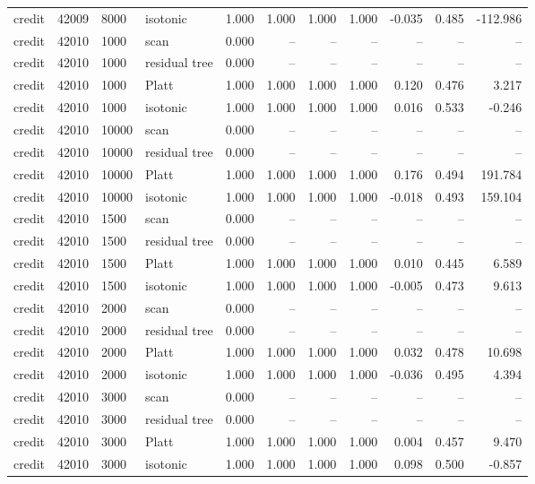 \begin{tabular}{lrllrrrrrrr}
credit & 42009 & 8000 & isotonic & 1.000 & 1.000 & 1.000 & 1.000 & -0.035 & 0.485 & -112.986 \\
credit & 42010 & 1000 & scan & 0.000 & -- & -- & -- & -- & -- & -- \\
credit & 42010 & 1000 & residual tree & 0.000 & -- & -- & -- & -- & -- & -- \\
credit & 42010 & 1000 & Platt & 1.000 & 1.000 & 1.000 & 1.000 & 0.120 & 0.476 & 3.217 \\
credit & 42010 & 1000 & isotonic & 1.000 & 1.000 & 1.000 & 1.000 & 0.016 & 0.533 & -0.246 \\
credit & 42010 & 10000 & scan & 0.000 & -- & -- & -- & -- & -- & -- \\
credit & 42010 & 10000 & residual tree & 0.000 & -- & -- & -- & -- & -- & -- \\
credit & 42010 & 10000 & Platt & 1.000 & 1.000 & 1.000 & 1.000 & 0.176 & 0.494 & 191.784 \\
credit & 42010 & 10000 & isotonic & 1.000 & 1.000 & 1.000 & 1.000 & -0.018 & 0.493 & 159.104 \\
credit & 42010 & 1500 & scan & 0.000 & -- & -- & -- & -- & -- & -- \\
credit & 42010 & 1500 & residual tree & 0.000 & -- & -- & -- & -- & -- & -- \\
credit & 42010 & 1500 & Platt & 1.000 & 1.000 & 1.000 & 1.000 & 0.010 & 0.445 & 6.589 \\
credit & 42010 & 1500 & isotonic & 1.000 & 1.000 & 1.000 & 1.000 & -0.005 & 0.473 & 9.613 \\
credit & 42010 & 2000 & scan & 0.000 & -- & -- & -- & -- & -- & -- \\
credit & 42010 & 2000 & residual tree & 0.000 & -- & -- & -- & -- & -- & -- \\
credit & 42010 & 2000 & Platt & 1.000 & 1.000 & 1.000 & 1.000 & 0.032 & 0.478 & 10.698 \\
credit & 42010 & 2000 & isotonic & 1.000 & 1.000 & 1.000 & 1.000 & -0.036 & 0.495 & 4.394 \\
credit & 42010 & 3000 & scan & 0.000 & -- & -- & -- & -- & -- & -- \\
credit & 42010 & 3000 & residual tree & 0.000 & -- & -- & -- & -- & -- & -- \\
credit & 42010 & 3000 & Platt & 1.000 & 1.000 & 1.000 & 1.000 & 0.004 & 0.457 & 9.470 \\
credit & 42010 & 3000 & isotonic & 1.000 & 1.000 & 1.000 & 1.000 & 0.098 & 0.500 & -0.857 \\

\end{tabular}
